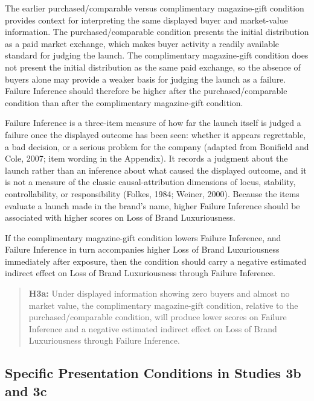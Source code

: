 \documentclass[12pt, a4paper]{article}
\begin{document}
The earlier purchased/comparable versus complimentary magazine-gift condition provides context for interpreting the same displayed buyer and market-value information. The purchased/comparable condition presents the initial distribution as a paid market exchange, which makes buyer activity a readily available standard for judging the launch. The complimentary magazine-gift condition does not present the initial distribution as the same paid exchange, so the absence of buyers alone may provide a weaker basis for judging the launch as a failure. Failure Inference should therefore be higher after the purchased/comparable condition than after the complimentary magazine-gift condition.

Failure Inference is a three-item measure of how far the launch itself is judged a failure once the displayed outcome has been seen: whether it appears regrettable, a bad decision, or a serious problem for the company (adapted from Bonifield and Cole, 2007; item wording in the Appendix). It records a judgment about the launch rather than an inference about what caused the displayed outcome, and it is not a measure of the classic causal-attribution dimensions of locus, stability, controllability, or responsibility (Folkes, 1984; Weiner, 2000). Because the items evaluate a launch made in the brand's name, higher Failure Inference should be associated with higher scores on Loss of Brand Luxuriousness.

If the complimentary magazine-gift condition lowers Failure Inference, and Failure Inference in turn accompanies higher Loss of Brand Luxuriousness immediately after exposure, then the condition should carry a negative estimated indirect effect on Loss of Brand Luxuriousness through Failure Inference.

\begin{quote}
\textbf{H3a:} Under displayed information showing zero buyers and almost no market value, the complimentary magazine-gift condition, relative to the purchased/comparable condition, will produce lower scores on Failure Inference and a negative estimated indirect effect on Loss of Brand Luxuriousness through Failure Inference.
\end{quote}

\subsection{Specific Presentation Conditions in Studies 3b and 3c}
\end{document}
